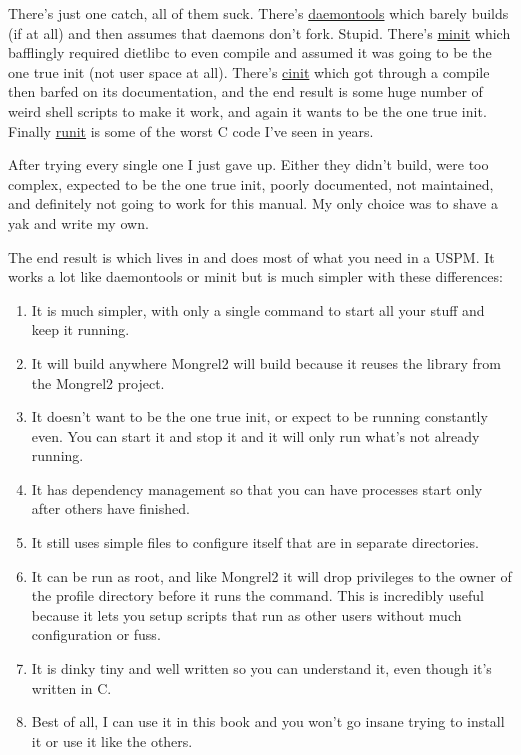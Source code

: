 There's just one catch, all of them suck.  There's \href{http://cr.yp.to/daemontools.html}{daemontools}
which barely builds (if at all) and then assumes that daemons don't fork.  Stupid.  There's 
\href{http://www.fefe.de/minit/}{minit} which bafflingly required dietlibc to even compile
and assumed it was going to be the one true init (not user space at all).  There's 
\href{http://www.nico.schottelius.org/software/cinit/}{cinit} which got through a compile
then barfed on its documentation, and the end result is some huge number of weird 
shell scripts to make it work, and again it wants to be the one true init.  Finally 
\href{http://smarden.org/runit/}{runit} is some of the worst C code I've seen in years.

After trying every single one I just gave up.  Either they didn't build, were too complex,
expected to be the one true init, poorly documented, not maintained, and definitely not
going to work for this manual.  My only choice was to shave a yak and write my own.

The end result is  which lives in  and does
most of what you need in a USPM.  It works a lot like daemontools or minit but
is much simpler with these differences:

\begin{enumerate}
\item It is much simpler, with only a single command to start all your stuff and
    keep it running.
\item It will build anywhere Mongrel2 will build because it reuses the 
    library from the Mongrel2 project.
\item It doesn't want to be the one true init, or expect to be running constantly even.
    You can start it and stop it and it will only run what's not already running.
\item It has dependency management so that you can have processes start only after others
    have finished.
\item It still uses simple files to configure itself that are in separate directories.
\item It can be run as root, and like Mongrel2 it will drop privileges to the owner 
    of the profile directory before it runs the command.  This is incredibly useful because
    it lets you setup scripts that run as other users without much configuration or fuss.
\item It is dinky tiny and well written so you can understand it, even though it's written
    in C.
\item Best of all, I can use it in this book and you won't go insane trying to install it
    or use it like the others.
\end{enumerate}

